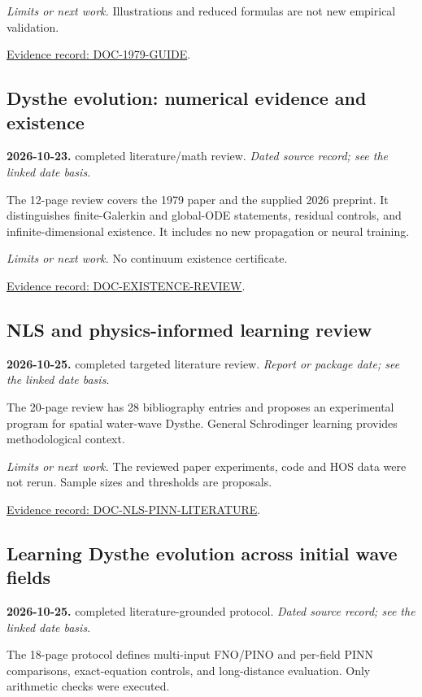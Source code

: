 \documentclass[11pt]{article}
\begin{document}
\noindent\textit{Limits or next work.} Illustrations and reduced formulas are not new empirical validation.

\noindent\href{https://github.com/matasvai/dysthe-paper/blob/codex/research-record-2026-11-05/research-record/2026-11-05/README.md#doc-1979-guide}{Evidence record: DOC-1979-GUIDE}.
\subsection*{Dysthe evolution: numerical evidence and existence}
\noindent\textbf{2026-10-23.} completed literature/math review. \emph{Dated source record; see the linked date basis}.\par
The 12-page review covers the 1979 paper and the supplied 2026 preprint. It distinguishes finite-Galerkin and global-ODE statements, residual controls, and infinite-dimensional existence. It includes no new propagation or neural training.

\noindent\textit{Limits or next work.} No continuum existence certificate.

\noindent\href{https://github.com/matasvai/dysthe-paper/blob/codex/research-record-2026-11-05/research-record/2026-11-05/README.md#doc-existence-review}{Evidence record: DOC-EXISTENCE-REVIEW}.
\subsection*{NLS and physics-informed learning review}
\noindent\textbf{2026-10-25.} completed targeted literature review. \emph{Report or package date; see the linked date basis}.\par
The 20-page review has 28 bibliography entries and proposes an experimental program for spatial water-wave Dysthe. General Schrodinger learning provides methodological context.

\noindent\textit{Limits or next work.} The reviewed paper experiments, code and HOS data were not rerun. Sample sizes and thresholds are proposals.

\noindent\href{https://github.com/matasvai/dysthe-paper/blob/codex/research-record-2026-11-05/research-record/2026-11-05/README.md#doc-nls-pinn-literature}{Evidence record: DOC-NLS-PINN-LITERATURE}.
\subsection*{Learning Dysthe evolution across initial wave fields}
\noindent\textbf{2026-10-25.} completed literature-grounded protocol. \emph{Dated source record; see the linked date basis}.\par
The 18-page protocol defines multi-input FNO/PINO and per-field PINN comparisons, exact-equation controls, and long-distance evaluation. Only arithmetic checks were executed.
\end{document}

